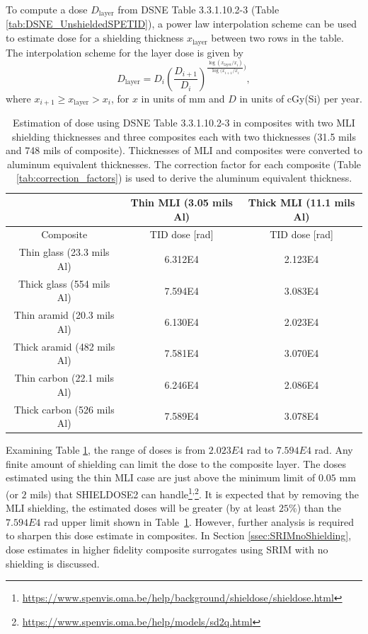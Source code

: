 \documentclass{hitec}
\begin{document}
To compute a dose $D_{\text{layer}}$ from DSNE Table 3.3.1.10.2-3 (Table \ref{tab:DSNE_UnshieldedSPETID}), a power law interpolation scheme can be used to estimate dose for a shielding thickness $x_{\text{layer}}$ between two rows in the table. The interpolation scheme for the layer dose is given by
\begin{equation}
D_{\text{layer}} = D_i\left(\frac{D_{i+1}}{D_i}\right)^{\frac{\log(x_{\text{layer}}/x_i)}{\log(x_{i+1}/x_i})},
\end{equation}
where $x_{i+1} \ge x_{\text{layer}} > x_i$, for $x$ in units of mm and $D$ in units of cGy(Si) per year.

\begin{table}[h]\centering
	\caption{Estimation of dose using DSNE Table 3.3.1.10.2-3 in composites with two MLI shielding thicknesses and three composites each with two thicknesses (31.5 mils and 748 mils of composite). Thicknesses of MLI and composites were converted to aluminum equivalent thicknesses. The correction factor for each composite (Table \ref{tab:correction_factors}) is used to derive the aluminum equivalent thickness.}\label{tab:dose_composite_DSNE}
	\begin{tabular}{|c | c | c |}\hline
			 &Thin MLI (3.05 mils Al) & Thick MLI (11.1 mils Al) \\\hline
		Composite & TID dose [rad] &  TID dose [rad] \\\hline
		Thin glass (23.3 mils Al)   & 6.312E4 & 2.123E4 \\\hline
		Thick glass (554 mils Al)   & 7.594E4 & 3.083E4 \\\hline
		Thin aramid (20.3 mils Al)  & 6.130E4 & 2.023E4\\\hline
		Thick aramid (482 mils Al)  & 7.581E4 & 3.070E4\\\hline
		Thin carbon (22.1 mils Al)  & 6.246E4 & 2.086E4\\\hline
		Thick carbon (526 mils Al) & 7.589E4 & 3.078E4\\\hline
	\end{tabular}
\end{table}

Examining Table \ref{tab:dose_composite_DSNE}, the range of doses is from $2.023E4$ rad to $7.594E4$ rad. Any finite amount of shielding can limit the dose to the composite layer. The doses estimated using the thin MLI case are just above the minimum limit of $0.05$ mm (or $2$ mils) that SHIELDOSE2 can handle\footnote{\url{https://www.spenvis.oma.be/help/background/shieldose/shieldose.html}}\textsuperscript{,}\footnote{\url{https://www.spenvis.oma.be/help/models/sd2q.html}}. It is expected that by removing the MLI shielding, the estimated doses will be greater (by at least $25\%$) than the $7.594E4$ rad upper limit shown in Table~\ref{tab:dose_composite_DSNE}. However, further analysis is required to sharpen this dose estimate in composites. In Section \ref{ssec:SRIMnoShielding}, dose estimates in higher fidelity composite surrogates using SRIM with no shielding is discussed.
\end{document}
